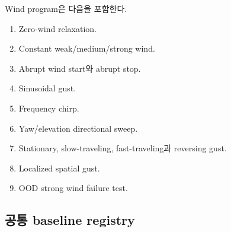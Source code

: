 \documentclass[11pt,a4paper]{article}
\begin{document}
Wind program은 다음을 포함한다.

\begin{enumerate}[leftmargin=1.7em]
  \item Zero-wind relaxation.
  \item Constant weak/medium/strong wind.
  \item Abrupt wind start와 abrupt stop.
  \item Sinusoidal gust.
  \item Frequency chirp.
  \item Yaw/elevation directional sweep.
  \item Stationary, slow-traveling, fast-traveling과 reversing gust.
  \item Localized spatial gust.
  \item OOD strong wind failure test.
\end{enumerate}

\subsection{공통 baseline registry}
\end{document}
